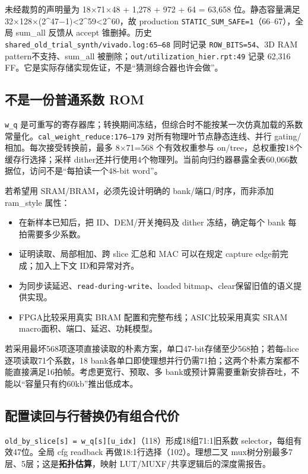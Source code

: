 \documentclass[UTF8,fontset=fandol,10pt,a4paper,openany]{ctexrep}
\newcommand{\code}[1]{\nolinkurl{#1}}
\begin{document}
未经裁剪的声明量为 18\ensuremath{\times}71\ensuremath{\times}48 + 1,278 + 972 + 64 = 63,658 位。静态容量满足 32\ensuremath{\times}128\ensuremath{\times}(2\textasciicircum{}47\ensuremath{-}1)<2\textasciicircum{}59<2\textasciicircum{}60，故 production \code{STATIC_SUM_SAFE=1}（66–67），全局 sum\_all 反馈从 accept 锥删掉。历史 \code{shared_old_trial_synth/vivado.log:65–68} 同时记录 \code{ROW_BITS=54}、3D RAM pattern不支持、sum\_all 被删除；\code{out/utilization_hier.rpt:49} 记录 62,316 FF。它是实际存储实现佐证，不是“猜测综合器也许会做”。


\subsection{不是一份普通系数 ROM}


\code{w_q} 是可重写的寄存器库；转换期间冻结，但综合时不能按某一次仿真加载的系数常量化。\code{cal_weight_reduce:176–179} 对所有物理叶节点静态连线、并行 gating/相加。每次接受转换前，最多 8\ensuremath{\times}71=568 个有效权重参与 on/tree，总权重按18个缓存行选择；采样 dither还并行使用4个物理列。当前向归约器暴露全表60,066数据位，访问不是“每拍读一个48-bit word”。


若希望用 SRAM/BRAM，必须先设计明确的 bank/端口/时序，而非添加 ram\_style 属性：


\begin{itemize}
\item 在新样本已知后，把 ID、DEM/开关掩码及 dither 冻结，确定每个 bank 每拍需要多少系数。
\item 证明读取、局部相加、跨 slice 汇总和 MAC 可以在规定 capture edge前完成；加入上下文 ID和异常对齐。
\item 为同步读延迟、\code{read-during-write}、loaded bitmap、clear保留旧值的语义提供实现。
\item FPGA比较采用真实 BRAM 配置和完整布线；ASIC比较采用真实 SRAM macro面积、端口、延迟、功耗模型。
\end{itemize}


若采用最坏568项逐项直接读取的朴素方案，单口47-bit存储至少568拍；若每slice逐项读取71个系数，18 bank各单口即使理想并行仍需71拍；这两个朴素方案都不能直接满足16拍帧。考虑更宽行、预取、多 bank或预计算需要重新安排吞吐，不能以“容量只有约60kb”推出低成本。


\subsection{配置读回与行替换仍有组合代价}


\code{old_by_slice[s] = w_q[s][u_idx]}（118）形成18组71:1旧系数 selector，每组有效47位。全局 cfg readback 再做18:1行选择（102）。理想二叉 mux树分别最多7层、5层；这是\textbf{拓扑估算}，映射 LUT/MUXF/共享逻辑后的深度需报告。
\end{document}
